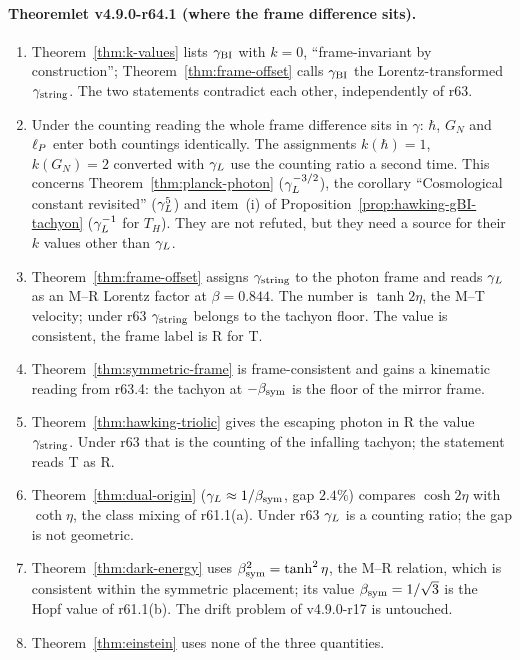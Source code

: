 \paragraph{Theoremlet v4.9.0-r64.1 (where the frame difference sits).}
\begin{enumerate}[leftmargin=2em]
\item[(a)] Theorem~\ref{thm:k-values} lists \(\gamma_{\mathrm{BI}}\) with \(k=0\), ``frame-invariant by construction''; Theorem~\ref{thm:frame-offset} calls \(\gamma_{\mathrm{BI}}\) the Lorentz-transformed
\(\gamma_{\mathrm{string}}\).  The two statements contradict each other, independently of r63.
\item[(b)] Under the counting reading the whole frame difference sits in \(\gamma\): \(\hbar\), \(G_N\) and \(\ell_P\) enter both countings identically.  The assignments
\(k(\hbar)=1\), \(k(G_N)=2\) converted with \(\gamma_L\) use the counting ratio a second time.  This concerns Theorem~\ref{thm:planck-photon} (\(\gamma_L^{-3/2}\)), the corollary
``Cosmological constant revisited'' (\(\gamma_L^{5}\)) and item~(i) of Proposition~\ref{prop:hawking-gBI-tachyon} (\(\gamma_L^{-1}\) for \(T_H\)).  They are not refuted, but they need a
source for their \(k\) values other than \(\gamma_L\).
\item[(c)] Theorem~\ref{thm:frame-offset} assigns \(\gamma_{\mathrm{string}}\) to the photon frame and reads \(\gamma_L\) as an M--R Lorentz factor at \(\beta=0.844\).  The number is \(\tanh2\eta\), the
M--T velocity; under r63 \(\gamma_{\mathrm{string}}\) belongs to the tachyon floor.  The value is consistent, the frame label is R for T.
\item[(d)] Theorem~\ref{thm:symmetric-frame} is frame-consistent and gains a kinematic reading from r63.4: the tachyon at \(-\beta_{\mathrm{sym}}\) is the floor of the mirror frame.
\item[(e)] Theorem~\ref{thm:hawking-triolic} gives the escaping photon in R the value \(\gamma_{\mathrm{string}}\).  Under r63 that is the counting of the infalling tachyon; the statement
reads T as R.
\item[(f)] Theorem~\ref{thm:dual-origin} (\(\gamma_L\approx1/\beta_{\mathrm{sym}}\), gap \(2.4\%\)) compares \(\cosh2\eta\) with \(\coth\eta\), the class mixing of r61.1(a).  Under r63 \(\gamma_L\) is a
counting ratio; the gap is not geometric.
\item[(g)] Theorem~\ref{thm:dark-energy} uses \(\beta_{\mathrm{sym}}^2=\tanh^2\eta\), the M--R relation, which is consistent within the symmetric placement; its value \(\beta_{\mathrm{sym}}=1/\sqrt3\) is the
Hopf value of r61.1(b).  The drift problem of v4.9.0-r17 is untouched.
\item[(h)] Theorem~\ref{thm:einstein} uses none of the three quantities.
\end{enumerate}

